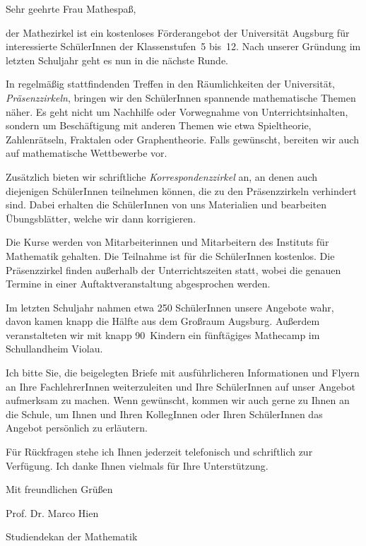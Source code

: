 \documentclass{zirkelbrief}
\begin{document}
\renewcommand{\anschrift}{%
      Holbein-Gymnasium Augsburg \\
      Fachbereich Mathematik \\
      Hallstraße 10 \\
      86150 Augsburg}
\renewcommand{\datum}{22.9.2014}
\renewcommand{\betreff}{Matheschülerzirkel der Universität Augsburg}

\makeletterhead

Sehr geehrte Frau Mathespaß,

der Mathezirkel ist ein kostenloses Förderangebot der Universität Augsburg für interessierte SchülerInnen
der Klassenstufen~5 bis~12. Nach unserer Gründung im letzten Schuljahr geht es nun in die nächste Runde.

In regelmäßig stattfindenden Treffen in den Räum\-lich\-kei\-ten der Universität, \emph{Präsenzzirkeln}, bringen wir
den SchülerInnen spannende mathematische Themen
näher. Es geht nicht um Nachhilfe oder Vorwegnahme von
Unterrichtsinhalten, sondern um Beschäftigung mit anderen Themen wie etwa
Spieltheorie, Zahlenrätseln, Fraktalen oder Graphentheorie. Falls gewünscht,
bereiten wir auch auf mathematische Wettbewerbe vor.

Zusätzlich bieten wir schriftliche \emph{Korrespondenzzirkel} an, an denen auch diejenigen Schü\-ler\-In\-nen teilnehmen können, die zu den Präsenzzirkeln verhindert sind. Dabei erhalten die SchülerInnen von uns
Materialien und bearbeiten Übungsblätter, welche wir dann korrigieren.

Die Kurse werden von Mitarbeiterinnen und Mitarbeitern des
Instituts für Mathematik gehalten. Die Teilnahme ist für die SchülerInnen kostenlos. Die Präsenzzirkel finden
außerhalb der Unterrichtszeiten statt, wobei die genauen Termine in einer
Auftaktveranstaltung abgesprochen werden.

Im letzten Schuljahr nahmen etwa 250 SchülerInnen unsere
Angebote wahr, davon kamen knapp die Hälfte aus dem Großraum Augsburg. Außerdem veranstalteten wir mit knapp 90~Kindern ein fünftägiges Mathecamp im Schullandheim Violau.

Ich bitte Sie, die beigelegten Briefe mit ausführlicheren Informationen und Flyern an Ihre
FachlehrerInnen weiterzuleiten und Ihre SchülerInnen auf unser
Angebot aufmerksam zu machen. Wenn gewünscht, kommen wir auch gerne zu Ihnen an die
Schule, um Ihnen und Ihren KollegInnen oder Ihren SchülerInnen das
Angebot persönlich zu erläutern.

Für Rückfragen stehe ich Ihnen jederzeit telefonisch und schriftlich
zur Verfügung. Ich danke Ihnen vielmals für Ihre Unterstützung.

Mit freundlichen Grüßen

\vspace{1cm}

Prof. Dr. Marco Hien

\vspace{-0.2cm}

{\small Studiendekan der Mathematik}
\end{document}
